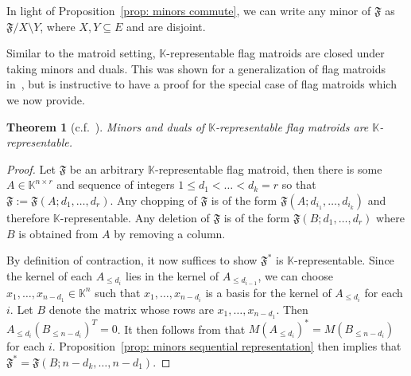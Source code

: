 \documentclass[12pt]{article}
\newtheorem{theorem}[thm]{Theorem}
\theoremstyle{definition}
\begin{document}
In light of Proposition~\ref{prop: minors commute}, we can write any minor of $\mathfrak{F}$ as $\mathfrak{F}/X\setminus Y$, where $X, Y \subseteq E$ and are disjoint. 

Similar to the matroid setting, $\mathbb{K}$-representable flag matroids are closed under taking minors and duals.
This was shown for a generalization of flag matroids in~\cite{jarra2024flag},
but is instructive to have a proof for the special case of flag matroids which we  now provide.

\begin{theorem}[{c.f.~\cite[Theorems 2.13 and 2.15]{jarra2024flag}}]\label{thm: minors and duals of representable}
    Minors and duals of $\mathbb{K}$-representable flag matroids are $\mathbb{K}$-representable.
\end{theorem}
\begin{proof}
    Let $\mathfrak{F}$ be an arbitrary $\mathbb{K}$-representable flag matroid, then there is some $A\in \mathbb{K}^{n\times r}$ and sequence of integers $1 \le d_1 < \dots < d_k = r$ so that $\mathfrak{F} := \mathfrak{F}(A;d_1,\dots,d_r)$. 
    Any chopping of $\mathfrak{F}$ is of the form $\mathfrak{F}(A;d_{i_1},\dots,d_{i_k})$ and therefore $\mathbb{K}$-representable.
    Any deletion of $\mathfrak{F}$ is of the form $\mathfrak{F}(B;d_1,\dots,d_r)$ where $B$ is obtained from $A$ by removing a column.
    
    By definition of contraction, it now suffices to show $\mathfrak{F}^*$ is $\mathbb{K}$-representable.
    Since the kernel of each $A_{\le d_i}$ lies in the kernel of $A_{\le d_{i-1}}$,
    we can choose $x_1,\dots,x_{n-d_1} \in \mathbb{K}^n$ such that
    $x_1,\dots,x_{n-d_i}$ is a basis for the kernel of $A_{\le d_i}$ for each $i$.
    Let $B$ denote the matrix whose rows are $x_1,\dots,x_{n-d_1}$.
    Then $A_{\le d_i} (B_{\le n-d_i})^T = 0$.
    It then follows from \cite[Theorem 2.2.8]{oxley}
    that $M(A_{\le d_i})^* = M(B_{\le n-d_i})$ for each $i$.
    Proposition~\ref{prop: minors sequential representation} then implies that $\mathfrak{F}^* = \mathfrak{F}(B;n-d_k,\dots,n-d_1)$.
\end{proof}
\end{document}
